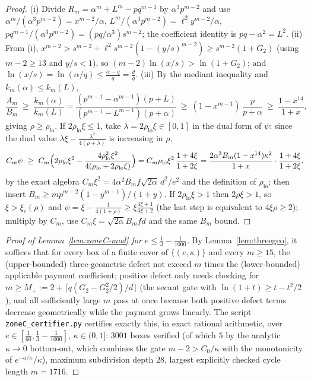 \documentclass[11pt]{article}
\begin{document}
\begin{proof}
(i) Divide $R_m=\alpha^m+L^m-pq^{m-1}$ by $\alpha^3p^{m-2}$ and use
$\alpha^m/(\alpha^3p^{m-2})=x^{m-2}/\alpha$,
$L^m/(\alpha^3p^{m-2})=\ell^2y^{m-2}/\alpha$,
$pq^{m-1}/(\alpha^3p^{m-2})=(pq/\alpha^3)s^{m-2}$; the coefficient identity is
$pq-\alpha^2=L^2$.  (ii) From (i),
$x^{m-2}>s^{m-2}+\ell^2s^{m-2}(1-(y/s)^{m-2})
\ge s^{m-2}(1+G_2)$ (using $m-2\ge13$ and $y/s<1$), so
$(m-2)\ln(x/s)>\ln(1+G_2)$; and $\ln(x/s)=\ln(\alpha/q)\le\frac{\alpha-q}q=\frac dq$.
(iii) By the mediant inequality and $k_m(\alpha)\le k_m(L)$,
\[
        \frac{A_m}{B_m}\ \ge\ \frac{k_m(\alpha)}{k_m(L)}
        =\frac{(p^{m-1}-\alpha^{m-1})(p+L)}{(p^{m-1}-L^{m-1})(p+\alpha)}
        \ \ge\ (1-x^{m-1})\,\frac{p}{p+\alpha}
        \ \ge\ \frac{1-x^{14}}{1+x},
\]
giving $\rho\ge\rho_{\mathrm{lo}}$.
If $2\rho_{\mathrm{lo}}\xi\le1$, take $\lambda=2\rho_{\mathrm{lo}}\xi\in[0,1]$
in the dual form of $\psi$: since the dual value
$\lambda\xi-\frac{\lambda^2}{4(\rho+\lambda)}$ is increasing in $\rho$,
\[
        C_m\psi\ \ge\
        C_m\Bigl(2\rho_{\mathrm{lo}}\xi^2
        -\frac{4\rho_{\mathrm{lo}}^2\xi^2}{4(\rho_{\mathrm{lo}}
        +2\rho_{\mathrm{lo}}\xi)}\Bigr)
        =C_m\rho_{\mathrm{lo}}\xi^2\,\frac{1+4\xi}{1+2\xi}
        =\frac{2\alpha^3B_m(1-x^{14})\kappa^2}{1+x}\cdot\frac{1+4\xi}{1+2\xi},
\]
by the exact algebra $C_m\xi^2=4\alpha^2B_mf\sqrt{2\alpha}\,d^2/e^2$ and the
definition of $\rho_{\mathrm{lo}}$; then insert
$B_m\ge mp^{m-2}(1-y^{m-1})/(1+y)$.  If $2\rho_{\mathrm{lo}}\xi>1$ then
$2\rho\xi>1$, so $\xi>\xi_c(\rho)$ and
$\psi=\xi-\frac1{4(1+\rho)}\ge\xi\frac{4\xi+1}{4\xi+2}$
(the last step is equivalent to $4\xi\rho\ge2$); multiply by
$C_m$, use $C_m\xi=\sqrt{2\alpha}B_mfd$ and the same $B_m$ bound.
\end{proof}

\begin{proof}[Proof of Lemma~\ref{lem:zoneC-mod} for $e\le\tfrac13-\tfrac1{1000}$]
By Lemma~\ref{lem:threegeo}, it suffices that for every box of a finite cover
of $\{(e,\kappa)\}$ and every $m\ge15$, the (upper-bounded) three-geometric
defect not exceed $m$ times the (lower-bounded) applicable payment
coefficient; positive defect only needs checking for
$m\ge M_+:=2+\lceil q(G_2-G_2^2/2)/d\rceil$ (the secant gate with
$\ln(1+t)\ge t-t^2/2$), and all sufficiently large $m$ pass at once because
both positive defect terms decrease geometrically while the payment grows
linearly.  The script \texttt{zoneC\_certifier.py} certifies exactly this, in
exact rational arithmetic, over $e\in[\tfrac1{60},\tfrac13-\tfrac1{1000}]$,
$\kappa\in(0,1]$: $3001$ boxes verified (of which $5$ by the analytic
$\kappa\to0$ bottom-out, which combines the gate $m-2>C_0/\kappa$ with the
monotonicity of $e^{-a/\kappa}/\kappa$), maximum subdivision depth $28$,
largest explicitly checked cycle length $m=1716$.
\end{proof}
\end{document}
